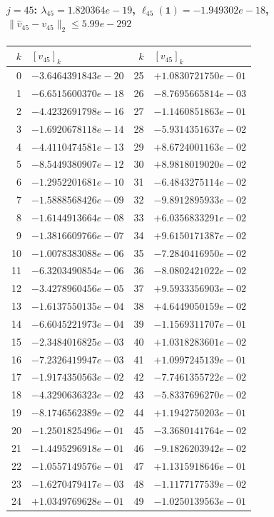 \paragraph{$j = 45$: $\lambda_{45} = 1.820364e-19$, \quad $\ell_{45}(\mathbf{1}) = -1.949302e-18$, \quad $\|\hat{v}_{45} - v_{45}\|_2 \leq 5.99e-292$}
\begin{center}
{\footnotesize
\begin{tabular}{r@{\;\;}l@{\quad}r@{\;\;}l}
\toprule
$k$ & $[v_{45}]_k$ & $k$ & $[v_{45}]_k$ \\
\midrule
0 & $-3.6464391843e-20$ & 25 & $+1.0830721750e-01$ \\
1 & $-6.6515600370e-18$ & 26 & $-8.7695665814e-03$ \\
2 & $-4.4232691798e-16$ & 27 & $-1.1460851863e-01$ \\
3 & $-1.6920678118e-14$ & 28 & $-5.9314351637e-02$ \\
4 & $-4.4110474581e-13$ & 29 & $+8.6724001163e-02$ \\
5 & $-8.5449380907e-12$ & 30 & $+8.9818019020e-02$ \\
6 & $-1.2952201681e-10$ & 31 & $-6.4843275114e-02$ \\
7 & $-1.5888568426e-09$ & 32 & $-9.8912895933e-02$ \\
8 & $-1.6144913664e-08$ & 33 & $+6.0356833291e-02$ \\
9 & $-1.3816609766e-07$ & 34 & $+9.6150171387e-02$ \\
10 & $-1.0078383088e-06$ & 35 & $-7.2840416950e-02$ \\
11 & $-6.3203490854e-06$ & 36 & $-8.0802421022e-02$ \\
12 & $-3.4278960456e-05$ & 37 & $+9.5933356903e-02$ \\
13 & $-1.6137550135e-04$ & 38 & $+4.6449050159e-02$ \\
14 & $-6.6045221973e-04$ & 39 & $-1.1569311707e-01$ \\
15 & $-2.3484016825e-03$ & 40 & $+1.0318283601e-02$ \\
16 & $-7.2326419947e-03$ & 41 & $+1.0997245139e-01$ \\
17 & $-1.9174350563e-02$ & 42 & $-7.7461355722e-02$ \\
18 & $-4.3290636323e-02$ & 43 & $-5.8337696270e-02$ \\
19 & $-8.1746562389e-02$ & 44 & $+1.1942750203e-01$ \\
20 & $-1.2501825496e-01$ & 45 & $-3.3680141764e-02$ \\
21 & $-1.4495296918e-01$ & 46 & $-9.1826203942e-02$ \\
22 & $-1.0557149576e-01$ & 47 & $+1.1315918646e-01$ \\
23 & $-1.6270479417e-03$ & 48 & $-1.1177177539e-02$ \\
24 & $+1.0349769628e-01$ & 49 & $-1.0250139563e-01$ \\
\bottomrule
\end{tabular}
}
\end{center}

